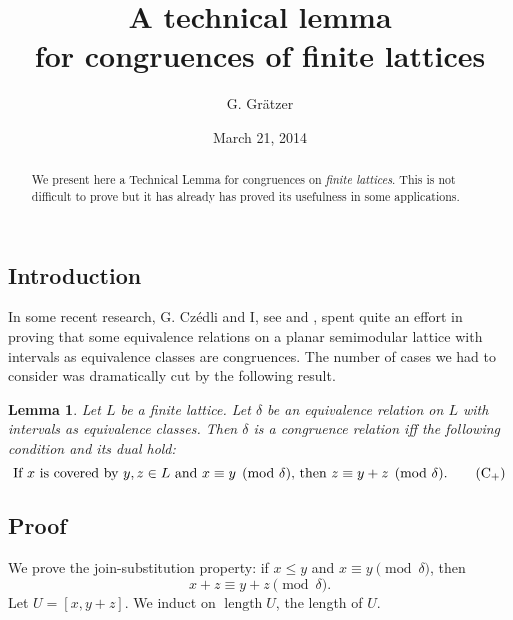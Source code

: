 \documentclass{amsart}
\newcommand{\pdelta}{\pmod{\delta}}
\DeclareMathOperator{\length}{length}
\newtheorem{lemma}{Lemma}
\begin{document}
\title{A technical lemma\\ for congruences of finite lattices}  
\author{G. Gr\"{a}tzer} 
\address{Department of Mathematics\\
  University of Manitoba\\
  Winnipeg, MB R3T 2N2\\
  Canada}
\date{March 21, 2014}
\begin{abstract}
We present here a Technical Lemma 
for congruences on \emph{finite lattices}.
This is not difficult to prove but it has already has proved 
its usefulness in some applications.
\end{abstract}
\maketitle

\subsection*{Introduction}\label{Intro}%
In some recent research, G. Cz\'edli
and I, see \cite{gC13} and \cite{GS13}, spent quite an effort
in proving that some equivalence relations 
on a planar semimodular lattice
with intervals as equivalence classes are congruences. 
The number of cases we had to consider
was dramatically cut by the following result.

\begin{lemma}\label{L:technical}%
Let $L$ be a finite lattice. 
Let $\delta$ be an equivalence relation on $L$
with intervals as equivalence classes.
Then $\delta$ is a congruence relation if{}f 
the following condition and its dual hold:
\begin{equation}\label{E:cover}%
\text{If $x$ is covered by $y,z \in L$ 
and $x \equiv y \pdelta$,
then $z \equiv y + z \pdelta$.}\tag{C${}_{+}$}
\end{equation}
\end{lemma}

\subsection*{Proof}\label{Proof}%
We prove the join-substitution property:  
if $x \leq y$ and $x \equiv y \pdelta$, then
\begin{equation}\label{E:Cjoin}%
x + z \equiv y + z \pdelta.
\end{equation}
Let $U = [x, y+ z]$.
We induct on $\length U$, the length of $U$.  
\end{document}
